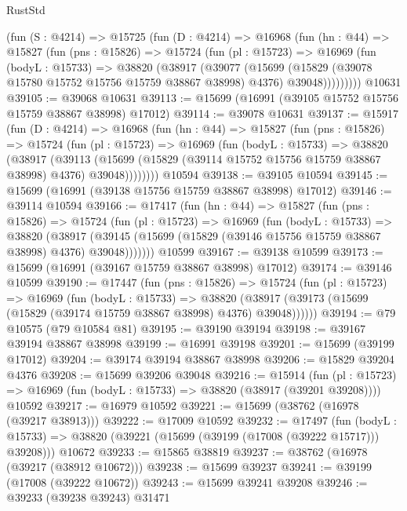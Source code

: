 \begin{lexlean}{RustStd}
\begin{coremodule}
    (fun (S : @4214) =>
    @15725
      (fun (D : @4214) =>
      @16968
        (fun (hn : @44) =>
        @15827
          (fun (pns : @15826) =>
          @15724
            (fun (pl : @15723) =>
            @16969
              (fun (bodyL : @15733) =>
              @38820
                (@38917
                  (@39077
                    (@15699
                      (@15829 (@39078 @15780 @15752 @15756 @15759 @38867 @38998) @4376)
                      @39048)))))))))
    @10631
@39105 := @39068 @10631
@39113 := @15699 (@16991 (@39105 @15752 @15756 @15759 @38867 @38998) @17012)
@39114 := @39078 @10631
@39137 := @15917
    (fun (D : @4214) =>
    @16968
      (fun (hn : @44) =>
      @15827
        (fun (pns : @15826) =>
        @15724
          (fun (pl : @15723) =>
          @16969
            (fun (bodyL : @15733) =>
            @38820
              (@38917
                (@39113
                  (@15699 (@15829 (@39114 @15752 @15756 @15759 @38867 @38998) @4376) @39048))))))))
    @10594
@39138 := @39105 @10594
@39145 := @15699 (@16991 (@39138 @15756 @15759 @38867 @38998) @17012)
@39146 := @39114 @10594
@39166 := @17417
    (fun (hn : @44) =>
    @15827
      (fun (pns : @15826) =>
      @15724
        (fun (pl : @15723) =>
        @16969
          (fun (bodyL : @15733) =>
          @38820
            (@38917
              (@39145 (@15699 (@15829 (@39146 @15756 @15759 @38867 @38998) @4376) @39048)))))))
    @10599
@39167 := @39138 @10599
@39173 := @15699 (@16991 (@39167 @15759 @38867 @38998) @17012)
@39174 := @39146 @10599
@39190 := @17447
    (fun (pns : @15826) =>
    @15724
      (fun (pl : @15723) =>
      @16969
        (fun (bodyL : @15733) =>
        @38820 (@38917 (@39173 (@15699 (@15829 (@39174 @15759 @38867 @38998) @4376) @39048))))))
@39194 := @79 @10575 (@79 @10584 @81)
@39195 := @39190 @39194
@39198 := @39167 @39194 @38867 @38998
@39199 := @16991 @39198
@39201 := @15699 (@39199 @17012)
@39204 := @39174 @39194 @38867 @38998
@39206 := @15829 @39204 @4376
@39208 := @15699 @39206 @39048
@39216 := @15914
    (fun (pl : @15723) => @16969 (fun (bodyL : @15733) => @38820 (@38917 (@39201 @39208))))
    @10592
@39217 := @16979 @10592
@39221 := @15699 (@38762 (@16978 (@39217 @38913)))
@39222 := @17009 @10592
@39232 := @17497
    (fun (bodyL : @15733) => @38820 (@39221 (@15699 (@39199 (@17008 (@39222 @15717))) @39208)))
    @10672
@39233 := @15865 @38819
@39237 := @38762 (@16978 (@39217 (@38912 @10672)))
@39238 := @15699 @39237
@39241 := @39199 (@17008 (@39222 @10672))
@39243 := @15699 @39241 @39208
@39246 := @39233 (@39238 @39243) @31471

\end{coremodule}
\end{lexlean}
